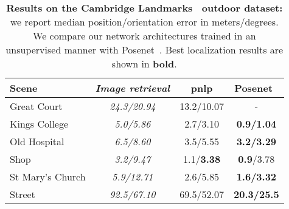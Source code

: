 \begin{table}
\centering

\begin{footnotesize}
\renewcommand{\arraystretch}{1.1}
\setlength{\tabcolsep}{4.5pt}
\begin{tabular}{l | c c | c }

Scene & \textit{Image retrieval} & \ac{pnlp} & {Posenet~\citep{Kendall2017}} \\
\hline	
\hline	
Great Court & \textit{{24.3/20.94}} & {13.2/10.07}  & - \\
Kings College 	& \textit{{5.0/5.86}} & {2.7/3.10} &  \textbf{0.9/1.04} \\
Old Hospital & \textit{{6.5/8.60}} &  {3.5/5.55} &  \textbf{3.2/3.29}  \\
Shop & \textit{{3.2/9.47}} & {1.1/\textbf{3.38}}  & \textbf{0.9}/3.78 \\
St Mary's Church & \textit{{5.9/12.71}}	& {2.6/5.85} &  \textbf{1.6/3.32}  \\
Street &  \textit{{92.5/67.10}} & {69.5/52.07}  & \textbf{20.3/25.5} \\
\hline	
\end{tabular}
\end{footnotesize}

\caption[Localization on outdoor scenes]{\label{tab:outdoor} \textbf{Results on the Cambridge Landmarks~\citep{Kendall2015} outdoor dataset:} we report median position/orientation error in meters/degrees. We compare our network architectures trained in an unsupervised manner with Posenet~\citep{Kendall2017}. Best localization results are shown in \textbf{bold}.}

\end{table}